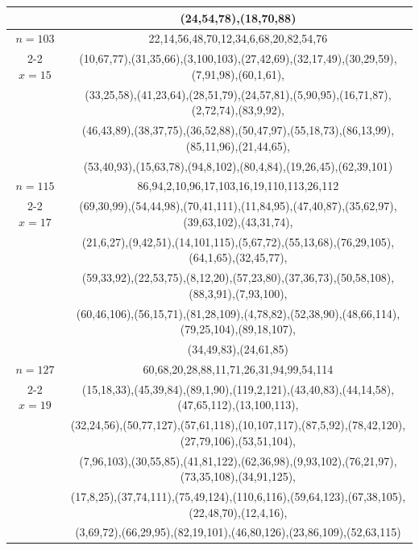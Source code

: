 \begin{tabular}{| c | c |}
&(24,54,78),(18,70,88)\\
\hline 
\(n=103\) & 
22,14,56,48,70,12,34,6,68,20,82,54,76\\
\cline{2-2}
\(x=15\)
&(10,67,77),(31,35,66),(3,100,103),(27,42,69),(32,17,49),(30,29,59),(7,91,98),(60,1,61),\\
&(33,25,58),(41,23,64),(28,51,79),(24,57,81),(5,90,95),(16,71,87),(2,72,74),(83,9,92),\\
&(46,43,89),(38,37,75),(36,52,88),(50,47,97),(55,18,73),(86,13,99),(85,11,96),(21,44,65),\\
&(53,40,93),(15,63,78),(94,8,102),(80,4,84),(19,26,45),(62,39,101)\\
\hline 
\(n=115\) & 
86,94,2,10,96,17,103,16,19,110,113,26,112\\
\cline{2-2}
\(x=17\)
&(69,30,99),(54,44,98),(70,41,111),(11,84,95),(47,40,87),(35,62,97),(39,63,102),(43,31,74),\\
&(21,6,27),(9,42,51),(14,101,115),(5,67,72),(55,13,68),(76,29,105),(64,1,65),(32,45,77),\\
&(59,33,92),(22,53,75),(8,12,20),(57,23,80),(37,36,73),(50,58,108),(88,3,91),(7,93,100),\\
&(60,46,106),(56,15,71),(81,28,109),(4,78,82),(52,38,90),(48,66,114),(79,25,104),(89,18,107),\\
&(34,49,83),(24,61,85)\\
\hline 
\(n=127\) & 
60,68,20,28,88,11,71,26,31,94,99,54,114\\
\cline{2-2}
\(x=19\)
&(15,18,33),(45,39,84),(89,1,90),(119,2,121),(43,40,83),(44,14,58),(47,65,112),(13,100,113),\\
&(32,24,56),(50,77,127),(57,61,118),(10,107,117),(87,5,92),(78,42,120),(27,79,106),(53,51,104),\\
&(7,96,103),(30,55,85),(41,81,122),(62,36,98),(9,93,102),(76,21,97),(73,35,108),(34,91,125),\\
&(17,8,25),(37,74,111),(75,49,124),(110,6,116),(59,64,123),(67,38,105),(22,48,70),(12,4,16),\\
&(3,69,72),(66,29,95),(82,19,101),(46,80,126),(23,86,109),(52,63,115)\\
\hline 
\end{tabular}